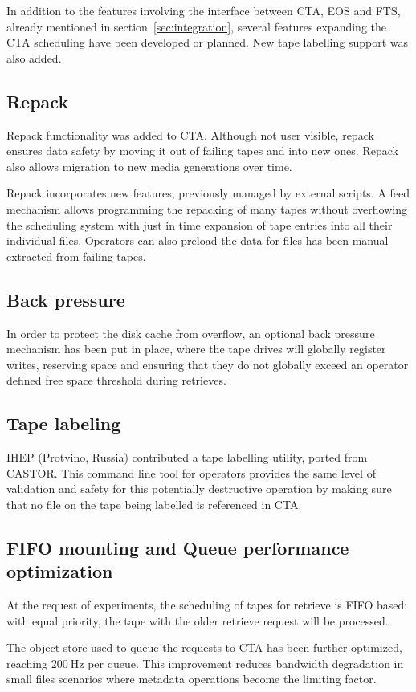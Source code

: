 \documentclass{webofc}
\begin{document}
In addition to the features involving the interface between CTA, EOS and FTS, already mentioned
in section~\ref{sec:integration}, several features expanding the CTA scheduling have been developed or planned.
New tape labelling support was also added.

\subsection{Repack}
Repack functionality was added to CTA. Although not user visible, repack ensures 
data safety by moving it out of failing tapes and into new ones. 
Repack also allows migration to new media generations over time.

Repack incorporates new features, previously managed by external scripts.
A feed mechanism allows programming the repacking of many tapes without overflowing the
scheduling system with just in time expansion of tape entries into all their individual files.
Operators can also preload the data for files has been manual extracted from failing tapes.

\subsection{Back pressure}
In order to protect the disk cache from overflow, an optional back pressure mechanism has been put in place,
where the tape drives will globally register writes, reserving space and ensuring that they do not globally
exceed an operator defined free space threshold during retrieves.

\subsection{Tape labeling}
IHEP (Protvino, Russia) contributed a tape labelling utility, ported from CASTOR. This command line tool for operators 
provides the same level of validation and safety for this potentially destructive operation by making sure that no file
on the tape being labelled is referenced in CTA.

\subsection{FIFO mounting and Queue performance optimization}
At the request of experiments, the scheduling of tapes for retrieve is FIFO based: with equal priority,
the tape with the older retrieve request will be processed.

The object store used to queue the requests to CTA has been further optimized, reaching $\SI{200}{\hertz}$ per queue.
This improvement reduces bandwidth degradation in small files scenarios where metadata operations become the limiting factor.
\end{document}
